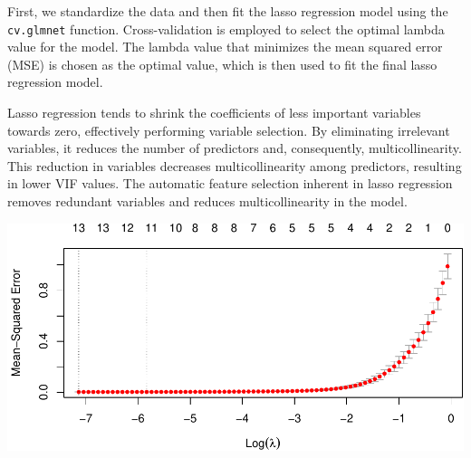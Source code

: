 \documentclass[
]{article}
\newenvironment{Shaded}{\begin{snugshade}}{\end{snugshade}}
\newcommand{\AttributeTok}[1]{\textcolor[rgb]{0.13,0.29,0.53}{#1}}
\newcommand{\CommentTok}[1]{\textcolor[rgb]{0.56,0.35,0.01}{\textit{#1}}}
\newcommand{\ConstantTok}[1]{\textcolor[rgb]{0.56,0.35,0.01}{#1}}
\newcommand{\DecValTok}[1]{\textcolor[rgb]{0.00,0.00,0.81}{#1}}
\newcommand{\FunctionTok}[1]{\textcolor[rgb]{0.13,0.29,0.53}{\textbf{#1}}}
\newcommand{\NormalTok}[1]{#1}
\newcommand{\OtherTok}[1]{\textcolor[rgb]{0.56,0.35,0.01}{#1}}
\newcommand{\SpecialCharTok}[1]{\textcolor[rgb]{0.81,0.36,0.00}{\textbf{#1}}}
\newcommand{\StringTok}[1]{\textcolor[rgb]{0.31,0.60,0.02}{#1}}
\begin{document}
First, we standardize the data and then fit the lasso regression model
using the \texttt{cv.glmnet} function. Cross-validation is employed to
select the optimal lambda value for the model. The lambda value that
minimizes the mean squared error (MSE) is chosen as the optimal value,
which is then used to fit the final lasso regression model.

Lasso regression tends to shrink the coefficients of less important
variables towards zero, effectively performing variable selection. By
eliminating irrelevant variables, it reduces the number of predictors
and, consequently, multicollinearity. This reduction in variables
decreases multicollinearity among predictors, resulting in lower VIF
values. The automatic feature selection inherent in lasso regression
removes redundant variables and reduces multicollinearity in the model.

\begin{Shaded}
\end{Shaded}

\begin{center}\includegraphics{Statistical_Learning_Final_Report_files/figure-latex/lasso_regression-1} \end{center}
\end{document}
